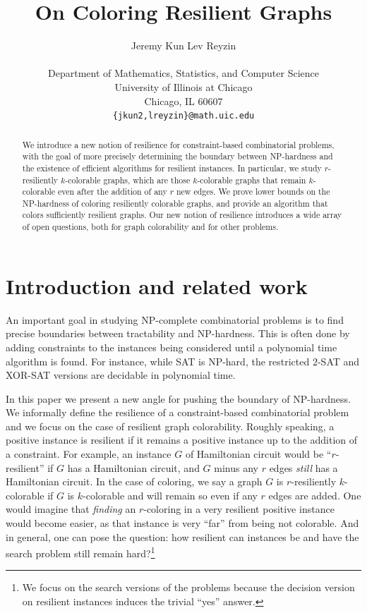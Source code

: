 \documentclass{article}[11pt]  %
\title{On Coloring Resilient Graphs}
\author{Jeremy Kun \qquad Lev Reyzin\\ \\
Department of Mathematics, Statistics, and Computer Science\\
University of Illinois at Chicago\\
Chicago, IL 60607\\
\texttt{\{jkun2,lreyzin\}@math.uic.edu}
}
\date{}
\begin{document}
\maketitle

\begin{abstract} 
We introduce a new notion of resilience for constraint-based combinatorial
problems, with the goal of more precisely determining the boundary between
NP-hardness and the existence of efficient algorithms for resilient instances.
In particular, we study $r$-resiliently $k$-colorable graphs, which are those
$k$-colorable graphs that remain $k$-colorable even after the addition of any
$r$ new edges.  We prove lower bounds on the NP-hardness of coloring
resiliently colorable graphs, and provide an algorithm that colors sufficiently
resilient graphs. Our new notion of resilience introduces a wide array of open
questions, both for graph colorability and for other problems.  
\end{abstract}

\section{Introduction and related work}

An important goal in studying NP-complete combinatorial problems is to find
precise boundaries between tractability and NP-hardness. This is often done by
adding constraints to the instances being considered until a polynomial time
algorithm is found.  For instance, while SAT is NP-hard, the restricted $2$-SAT
and XOR-SAT versions are decidable in polynomial time.  

In this paper we present a new angle for pushing the boundary of NP-hardness.
We informally define the resilience of a constraint-based combinatorial problem
and we focus on the case of resilient graph colorability. Roughly speaking, a
positive instance is resilient if it remains a positive instance up to the
addition of a constraint. For example, an instance $G$ of Hamiltonian circuit
would be ``$r$-resilient'' if $G$ has a Hamiltonian circuit, and $G$ minus any
$r$ edges \emph{still} has a Hamiltonian circuit. In the case of coloring, we
say a graph $G$ is $r$-resiliently $k$-colorable if $G$ is $k$-colorable and
will remain so even if any $r$ edges are added. One would imagine that
\emph{finding} an $r$-coloring in a very resilient positive instance would
become easier, as that instance is very ``far'' from being not colorable.  And
in general, one can pose the question: how resilient can instances be and have
the search problem still remain hard?\footnote{We focus on the search versions
of the problems because the decision version on resilient instances induces the
trivial ``yes'' answer.}
\end{document}
